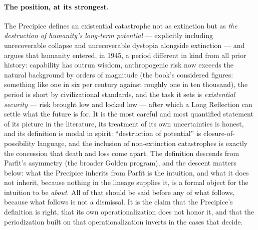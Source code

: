 \paragraph{The position, at its strongest.} The Precipice defines an
existential catastrophe not as extinction but as \emph{the destruction
of humanity's long-term potential} --- explicitly including
unrecoverable collapse and unrecoverable dystopia alongside extinction
--- and argues that humanity entered, in 1945, a period different in
kind from all prior history: capability has outrun wisdom, anthropogenic
risk now exceeds the natural background by orders of magnitude (the
book's considered figures: something like one in six per century
against roughly one in ten thousand), the period is short by
civilizational standards, and the task it sets is \emph{existential
security} --- risk brought low and locked low --- after which a Long
Reflection can settle what the future is for. It is the most careful
and most quantified statement of its picture in the literature, its
treatment of its own uncertainties is honest, and its definition is
modal in spirit: ``destruction of potential'' is closure-of-possibility
language, and the inclusion of non-extinction catastrophes is exactly
the concession that death and loss come apart. The definition
descends from Parfit's asymmetry \cite{Parfit84}
(the broader Golden program), and the descent matters below:
what the Precipice inherits from Parfit is the intuition, and what it
does not inherit, because nothing in the lineage supplies it, is
a formal object for the intuition to be \emph{about}. All of that should be
said before any of what follows, because what follows is not a
dismissal. It is the claim that the Precipice's definition is right,
that its own operationalization does not honor it, and that the
periodization built on that operationalization inverts in the cases
that decide.

